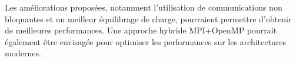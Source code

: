 \documentclass[11pt]{article}
\begin{document}
Les améliorations proposées, notamment l'utilisation de communications non bloquantes et un meilleur équilibrage de charge, pourraient permettre d'obtenir de meilleures performances. Une approche hybride MPI+OpenMP pourrait également être envisagée pour optimiser les performances sur les architectures modernes.
\end{document}
